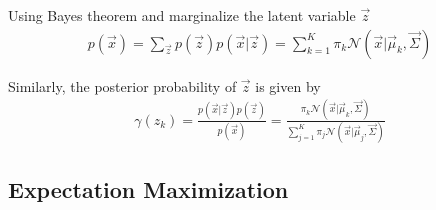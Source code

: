 \documentclass[12pt,twoside]{article}
\begin{document}
Using Bayes theorem and marginalize the latent variable $\vec{z}$
\begin{align*}
p(\vec{x}) =\sum_{\vec{z}}p(\vec{z})p(\vec{x}\vert \vec{z}) = \sum_{k=1}^K \pi_k\mathcal{N}(\vec{x}\vert \vec{\mu}_k, \vec{\Sigma})
\end{align*}

Similarly, the posterior probability of $\vec{z}$ is given by
\begin{align*}
\gamma (z_k) = \frac{p(\vec{x}\vert \vec{z})p(\vec{z})}{p(\vec{x})} = \frac{\pi_k \mathcal{N}(\vec{x}\vert \vec{\mu}_k, \vec{\Sigma}) }{\sum_{j=1}^K \pi_j\mathcal{N}(\vec{x}\vert \vec{\mu}_j, \vec{\Sigma})}
\end{align*}

\subsection{Expectation Maximization}
\end{document}
